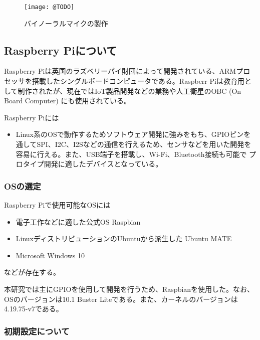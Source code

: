 \begin{figure}
\centering
\texttt{[image: @TODO]}
\caption{バイノーラルマイクの製作}
\end{figure}

\hypertarget{raspberry-piux306bux3064ux3044ux3066}{%
\subsection{Raspberry
Piについて}\label{raspberry-piux306bux3064ux3044ux3066}}

Raspberry
Piは英国のラズベリーパイ財団によって開発されている、ARMプロセッサを搭載したシングルボードコンピュータである。Raspberr
Piは教育用として制作されたが、現在ではIoT製品開発などの業務や人工衛星のOBC
(On Board Computer) にも使用されている。

Raspberry Piには

\begin{itemize}
\tightlist
\item
  Linux系のOSで動作するためソフトウェア開発に強みをもち、GPIOピンを通してSPI、I2C、I2Sなどの通信を行えるため、センサなどを用いた開発を容易に行える。また、USB端子を搭載し、Wi-Fi、Bluetooth接続も可能で
  プロタイプ開発に適したデバイスとなっている。
\end{itemize}

\hypertarget{osux306eux9078ux5b9a}{%
\subsubsection{OSの選定}\label{osux306eux9078ux5b9a}}

Raspberry Piで使用可能なOSには

\begin{itemize}
\tightlist
\item
  電子工作などに適した公式OS Raspbian
\item
  LinuxディストリビューションのUbuntuから派生した Ubuntu MATE
\item
  Microsoft Windows 10
\end{itemize}

などが存在する。

本研究では主にGPIOを使用して開発を行うため、Raspbianを使用した。なお、OSのバージョンは10.1
Buster Liteである。また、カーネルのバージョンは4.19.75-v7である。

\hypertarget{ux521dux671fux8a2dux5b9aux306bux3064ux3044ux3066}{%
\subsubsection{初期設定について}\label{ux521dux671fux8a2dux5b9aux306bux3064ux3044ux3066}}

